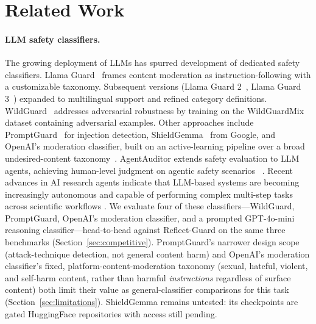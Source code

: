 \documentclass[superintelligence,article,submit,pdftex,moreauthors]{Definitions/mdpi}
\begin{document}
\section{Related Work}

\paragraph{LLM safety classifiers.}
The growing deployment of LLMs has spurred development of dedicated safety classifiers. Llama Guard~\citep{inan2023llamaguard} frames content moderation as instruction-following with a customizable taxonomy. Subsequent versions (Llama Guard 2~\citep{metallamaguard2}, Llama Guard 3~\citep{metallamaguard3}) expanded to multilingual support and refined category definitions. WildGuard~\citep{han2024wildguard} addresses adversarial robustness by training on the WildGuardMix dataset containing adversarial examples. Other approaches include PromptGuard~\citep{meta2024promptguard} for injection detection, ShieldGemma~\citep{zeng2024shieldgemma} from Google, and OpenAI's moderation classifier, built on an active-learning pipeline over a broad undesired-content taxonomy~\citep{markov2023holistic}. AgentAuditor extends safety evaluation to LLM agents, achieving human-level judgment on agentic safety scenarios ~\citep{luo2025agentauditor}. Recent advances in AI research agents indicate that LLM-based systems are becoming increasingly autonomous and capable of performing complex multi-step tasks across scientific workflows \citep{kong2026aiautoresearch}. We evaluate four of these classifiers---WildGuard, PromptGuard, OpenAI's moderation classifier, and a prompted GPT-4o-mini reasoning classifier---head-to-head against Reflect-Guard on the same three benchmarks (Section~\ref{sec:competitive}). PromptGuard's narrower design scope (attack-technique detection, not general content harm) and OpenAI's moderation classifier's fixed, platform-content-moderation taxonomy (sexual, hateful, violent, and self-harm content, rather than harmful \emph{instructions} regardless of surface content) both limit their value as general-classifier comparisons for this task (Section~\ref{sec:limitations}). ShieldGemma remains untested: its checkpoints are gated HuggingFace repositories with access still pending.
\end{document}
